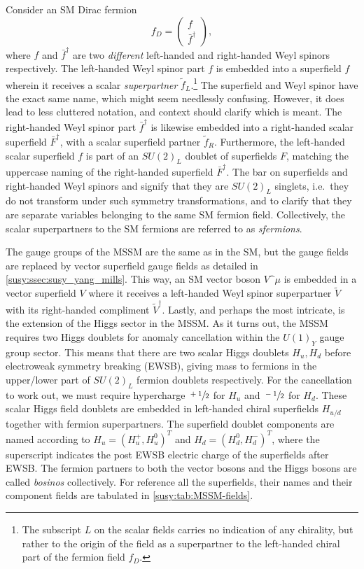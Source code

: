 \documentclass[../main.tex]{subfiles}
\begin{document}
Consider an SM Dirac fermion
\begin{equation}
  f_D = \begin{pmatrix}
    f \\ \bar{f}^\dagger
  \end{pmatrix},
\end{equation}
where \(f\) and \(\bar{f}^\dagger\) are two \emph{different} left-handed and right-handed Weyl spinors respectively.
The left-handed Weyl spinor part \(f\) is embedded into a superfield \(f\) wherein it receives a scalar \emph{superpartner} \(\tilde{f}_L\).\footnote{The subscript \(L\) on the scalar fields carries no indication of any chirality, but rather to the origin of the field as a superpartner to the left-handed chiral part of the fermion field \(f_D\).}
The superfield and Weyl spinor have the exact same name, which might seem needlessly confusing. However, it does lead to less cluttered notation, and context should clarify which is meant.
The right-handed Weyl spinor part \(\bar{f}^\dagger\) is likewise embedded into a right-handed scalar superfield \(\bar{F}^\dagger\), with a scalar superfield partner \(\tilde{f}_R\).
Furthermore, the left-handed scalar superfield \(f\) is part of an \(SU(2)_L\) doublet of superfields \(F\), matching the uppercase naming of the right-handed superfield \(\bar{F}^\dagger\).
The bar on superfields and right-handed Weyl spinors and signify that they are \(SU(2)_L\) singlets, i.e.\ they do not transform under such symmetry transformations, and to clarify that they are separate variables belonging to the same SM fermion field.
Collectively, the scalar superpartners to the SM fermions are referred to as \emph{sfermions}.

The gauge groups of the MSSM are the same as in the SM, but the gauge fields are replaced by vector superfield gauge fields as detailed in \cref{susy:ssec:susy_yang_mills}.
This way, an SM vector boson \(V\^\mu\) is embedded in a vector superfield \(V\) where it receives a left-handed Weyl spinor superpartner \(\tilde{V}\) with its right-handed compliment \(\tilde{V}^\dagger\).
Lastly, and perhaps the most intricate, is the extension of the Higgs sector in the MSSM.
As it turns out\needcite, the MSSM requires two Higgs doublets for anomaly cancellation within the \(U(1)_Y\) gauge group sector.
This means that there are two scalar Higgs doublets \(H_u, H_d\) before electroweak symmetry breaking (EWSB), giving mass to fermions in the upper/lower part of \(SU(2)_L\) fermion doublets respectively.
For the cancellation to work out, we must require hypercharge \(\sfrac{+1}{2}\) for \(H_u\) and \(\sfrac{-1}{2}\) for \(H_d\).
These scalar Higgs field doublets are embedded in left-handed chiral superfields \(H_{u/d}\) together with fermion superpartners.
The superfield doublet components are named according to \(H_u = (H_u^+, H_u^0)^T\) and \(H_d = (H_d^0, H_d^-)^T\), where the superscript indicates the post EWSB electric charge of the superfields after EWSB.
The fermion partners to both the vector bosons and the Higgs bosons are called \emph{bosinos} collectively.
For reference all the superfields, their names and their component fields are tabulated in \cref{susy:tab:MSSM-fields}.
\end{document}
